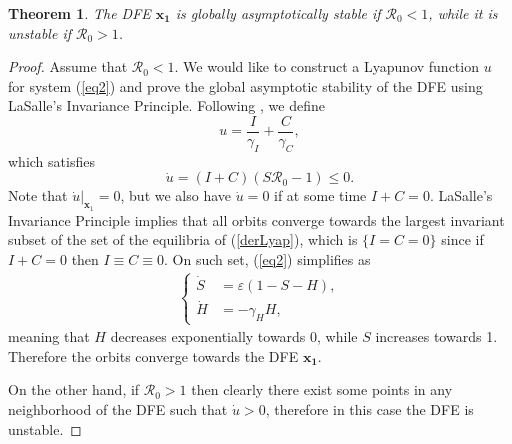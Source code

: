 \documentclass[11pt,reqno]{amsart}
\newtheorem{theorem}{Theorem}
\theoremstyle{boldremark}
\begin{document}
\begin{theorem} \label{teo1}
    The DFE $\mathbf{x_1}$ is globally asymptotically stable if $\mathcal{R}_0 < 1$, while it is unstable if $\mathcal{R}_0 > 1$. 
\end{theorem}
\begin{proof}
    Assume that $\mathcal{R}_0 < 1$. We would like to construct a Lyapunov function $u$ for system (\ref{eq2}) and prove the global asymptotic stability of the DFE using LaSalle's Invariance Principle. Following \cite{4}, we define 
    \begin{equation*} 
        u = \frac{I}{\gamma_I} + \frac{C}{\gamma_C}, 
    \end{equation*}
    which satisfies 
    \begin{equation} \label{derLyap}
        \dot{u} = (I+C) (S \mathcal{R}_0-1) \le 0. 
    \end{equation}
    Note that $\dot{u}|_{\mathbf{x}_1}=0$, but we also have $\dot{u}=0$ if at some time $I+C=0$. LaSalle's Invariance Principle implies that all orbits converge towards the largest invariant subset of the set of the equilibria of (\ref{derLyap}), which is $\{I=C=0\}$ since if $I+C=0$ then $I \equiv C \equiv 0$. On such set, (\ref{eq2}) simplifies as  
    \begin{align*}
    \left\{
    \begin{aligned}
        \dot{S} &= \varepsilon (1-S-H), \\ 
        \dot{H} &= -\gamma_H H, 
    \end{aligned}
    \right.
    \end{align*}
    meaning that $H$ decreases exponentially towards 0, while $S$ increases towards 1. Therefore the orbits converge towards the DFE $\mathbf{x_1}$.
    
    On the other hand, if $\mathcal{R}_0 > 1$ then clearly there exist some points in any neighborhood of the DFE such that $\dot{u}>0$, therefore in this case the DFE is unstable. 

    \medskip


\end{proof}
\end{document}
